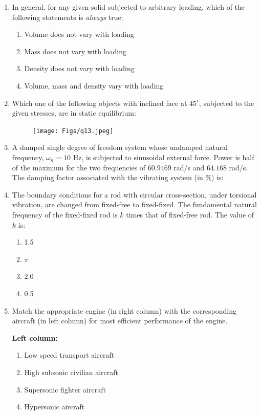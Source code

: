 \documentclass[journal]{IEEEtran}
\begin{document}
\begin{enumerate}
\item In general, for any given solid subjected to arbitrary loading, which of the following statements is \textit{always} true:

\begin{enumerate}
    \item Volume does not vary with loading
    \item Mass does not vary with loading
    \item Density does not vary with loading
    \item Volume, mass and density vary with loading
\end{enumerate}
\hfill{}

\item Which one of the following objects with inclined face at $45^\circ$, subjected to the given stresses, are in static equilibrium:
\begin{figure}[H]
\centering
\texttt{[image: Figs/q13.jpeg]}
\caption{}
\end{figure}
\hfill{}

\item  
A damped single degree of freedom system whose undamped natural frequency, $\omega_n = 10$ Hz, is subjected to sinusoidal external force.  
Power is half of the maximum for the two frequencies of $60.9469$ rad/s and $64.168$ rad/s.  
The damping factor associated with the vibrating system (in \%) is:

\item  
The boundary conditions for a rod with circular cross-section, under torsional vibration, are changed from fixed-free to fixed-fixed.  
The fundamental natural frequency of the fixed-fixed rod is $k$ times that of fixed-free rod.  
The value of $k$ is:

\begin{enumerate}
    \item 1.5
    \item $\pi$
    \item 2.0
    \item 0.5
\end{enumerate}
\hfill{}

\item  
Match the appropriate engine (in right column) with the corresponding aircraft (in left column)  
for most efficient performance of the engine.

\begin{multicols}{2}
\textbf{Left column:}
\begin{enumerate}
    \item Low speed transport aircraft
    \item High subsonic civilian aircraft
    \item Supersonic fighter aircraft
    \item Hypersonic aircraft
\end{enumerate}


\end{multicols}
\end{enumerate}
\end{document}
